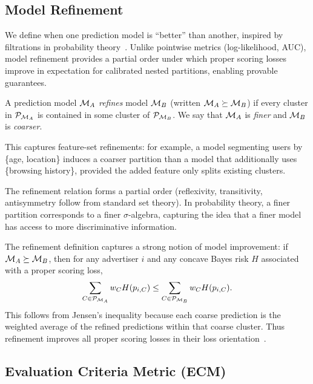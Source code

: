 \subsection{Model Refinement}
\label{subsec:model_refinement}

We define when one prediction model is ``better'' than another, inspired by filtrations in probability theory~\citep{durrett2019probability}. Unlike pointwise metrics (log-likelihood, AUC), model refinement provides a partial order under which proper scoring losses improve in expectation for calibrated nested partitions, enabling provable guarantees.

\begin{definition}
\label{def:model_refinement}
A prediction model $\mathcal{M}_A$ \emph{refines} model $\mathcal{M}_B$ (written $\mathcal{M}_A \succeq \mathcal{M}_B$) if every cluster in $\mathcal{P}_{\mathcal{M}_A}$ is contained in some cluster of $\mathcal{P}_{\mathcal{M}_B}$. We say that $\mathcal{M}_A$ is \emph{finer} and $\mathcal{M}_B$ is \emph{coarser}.
\end{definition}

This captures feature-set refinements: for example, a model segmenting users by \{age, location\} induces a coarser partition than a model that additionally uses \{browsing history\}, provided the added feature only splits existing clusters.

The refinement relation forms a partial order (reflexivity, transitivity, antisymmetry follow from standard set theory). In probability theory, a finer partition corresponds to a finer $\sigma$-algebra, capturing the idea that a finer model has access to more discriminative information.

The refinement definition captures a strong notion of model improvement: if $\mathcal{M}_A \succeq \mathcal{M}_B$, then for any advertiser $i$ and any concave Bayes risk $H$ associated with a proper scoring loss,
\[
\sum_{C \in \mathcal{P}_{\mathcal{M}_A}} w_C H(p_{i,C}) \leq \sum_{C \in \mathcal{P}_{\mathcal{M}_B}} w_C H(p_{i,C}).
\]
This follows from Jensen's inequality because each coarse prediction is the weighted average of the refined predictions within that coarse cluster. Thus refinement improves all proper scoring losses in their loss orientation~\citep{gneiting2007probabilistic}.

\subsection{Evaluation Criteria Metric (ECM)}
\label{subsec:ecm}

